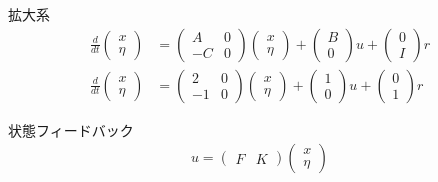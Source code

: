 \documentclass[a4paper,11pt,fleqn]{jreport}
\begin{document}
拡大系
\begin{align*}
	\frac{d}{dt}
	\left (
	\begin{array}{c}
	 x \\ \eta 
	\end{array}
	\right )
	& = 
	\left (
	\begin{array}{cc}
	 A & 0 \\
	 -C& 0
	\end{array}
	\right )
	\left (
	\begin{array}{c}
	 x \\ \eta 
	\end{array}
	\right )
	+
	\left (
	\begin{array}{c}
	 B \\ 0 
	\end{array}
	\right )
	u
	+
	\left (
	\begin{array}{c}
	 0 \\ I 
	\end{array}
	\right )
	r
\\
	\frac{d}{dt}
	\left (
	\begin{array}{c}
	 x \\ \eta 
	\end{array}
	\right )
	& = 
	\left (
	\begin{array}{cc}
	 2 & 0 \\
	 -1& 0
	\end{array}
	\right )
	\left (
	\begin{array}{c}
	 x \\ \eta 
	\end{array}
	\right )
	+
	\left (
	\begin{array}{c}
	 1 \\ 0 
	\end{array}
	\right )
	u
	+
	\left (
	\begin{array}{c}
	 0 \\ 1 
	\end{array}
	\right )
	r
\end{align*}

状態フィードバック
\begin{align*}
	u = \left ( \begin{array}{cc}
			F & K \end{array} \right )
		\left (
		\begin{array}{c}
		 x \\ \eta 
		\end{array}
		\right )
\end{align*}
\end{document}
